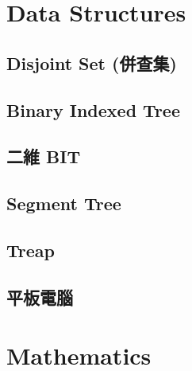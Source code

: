 \documentclass[a4paper,10pt,twocolumn,oneside]{article}
\newcommand{\inputcpp}[1]{}  %
\begin{document}

\section{Data Structures}

\subsection{Disjoint Set (併查集)}
\inputcpp{data_structure/dsu.cpp}

\subsection{Binary Indexed Tree}
\inputcpp{data_structure/bit.cpp}

\subsection{二維 BIT}
\inputcpp{data_structure/bit_2D.cpp}

\subsection{Segment Tree}
\inputcpp{data_structure/segment_tree.cpp}

\subsection{Treap}
\inputcpp{data_structure/treap.cpp}

\subsection{平板電腦}
\inputcpp{data_structure/pbds.cpp}



\section{Mathematics}

\renewcommand{\mod}{\text{ mod }}
\end{document}
